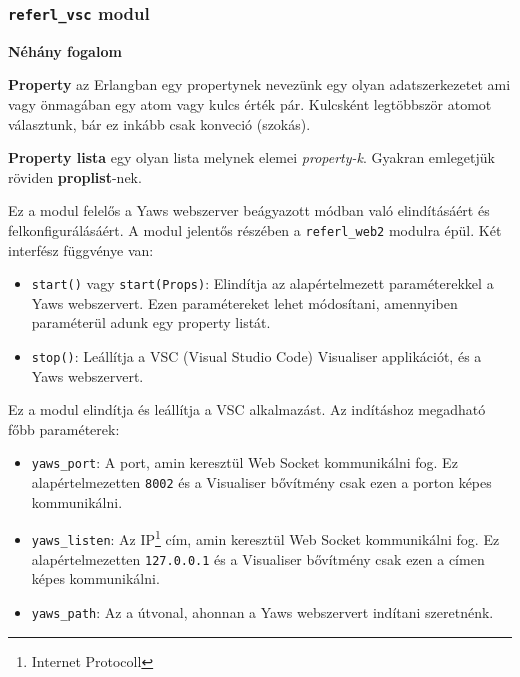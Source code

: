 \newpage

\subsubsection{\lstinline{referl_vsc} modul}

\noindent \textbf{Néhány fogalom}

\vspace{14pt}
\noindent \textbf{Property} az Erlangban egy propertynek nevezünk egy olyan adatszerkezetet  ami vagy önmagában egy atom vagy kulcs érték pár. Kulcsként legtöbbször atomot választunk, bár ez inkább csak konveció (szokás).

\vspace{14pt}
\noindent \textbf{Property lista} egy olyan lista melynek elemei \textit{property-k}. Gyakran emlegetjük röviden \textbf{proplist}-nek.

\vspace{14pt}
Ez a modul felelős a Yaws webszerver beágyazott módban való elindításáért és felkonfigurálásáért. \cite{zacharyYawsBook}
A modul jelentős részében a \lstinline{referl_web2} modulra épül. Két interfész függvénye van:

\begin{itemize}
    \item \lstinline{start()} vagy \lstinline{start(Props)}: Elindítja az alapértelmezett paraméterekkel a Yaws webszervert. Ezen paramétereket lehet módosítani, amennyiben paraméterül adunk egy property listát.
    \item \lstinline{stop()}: Leállítja a VSC (Visual Studio Code) Visualiser applikációt, és a Yaws webszervert.
\end{itemize}
 
Ez a modul elindítja és leállítja a VSC alkalmazást. Az indításhoz megadható főbb paraméterek:

\begin{itemize}
    \item \lstinline{yaws_port}: A port, amin keresztül Web Socket kommunikálni fog. Ez alapértelmezetten \lstinline{8002} és a Visualiser bővítmény csak ezen a porton képes kommunikálni.
    \item \lstinline{yaws_listen}: Az IP\footnote{Internet Protocoll} cím, amin keresztül Web Socket kommunikálni fog. Ez alapértelmezetten \lstinline{127.0.0.1} és a Visualiser bővítmény csak ezen a címen képes kommunikálni.
    \item \lstinline{yaws_path}: Az a útvonal, ahonnan a Yaws webszervert indítani szeretnénk. 

\end{itemize}

